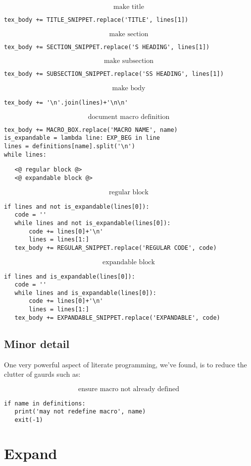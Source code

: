 \documentclass{article}
\begin{document}
$$\boxed{\text{make title}}$${\color{YellowOrange}\begin{verbatim}tex_body += TITLE_SNIPPET.replace('TITLE', lines[1])
\end{verbatim}}$$\boxed{\text{make section}}$${\color{YellowOrange}\begin{verbatim}tex_body += SECTION_SNIPPET.replace('S HEADING', lines[1])
\end{verbatim}}$$\boxed{\text{make subsection}}$${\color{YellowOrange}\begin{verbatim}tex_body += SUBSECTION_SNIPPET.replace('SS HEADING', lines[1])
\end{verbatim}}$$\boxed{\text{make body}}$${\color{YellowOrange}\begin{verbatim}tex_body += '\n'.join(lines)+'\n\n'
\end{verbatim}}$$\boxed{\text{document macro definition}}$${\color{YellowOrange}\begin{verbatim}tex_body += MACRO_BOX.replace('MACRO NAME', name)
is_expandable = lambda line: EXP_BEG in line
lines = definitions[name].split('\n')
while lines:
\end{verbatim}}{\color{MidnightBlue}\begin{verbatim}   <@ regular block @>
   <@ expandable block @>
\end{verbatim}}$$\boxed{\text{regular block}}$${\color{YellowOrange}\begin{verbatim}if lines and not is_expandable(lines[0]):
   code = ''
   while lines and not is_expandable(lines[0]):
       code += lines[0]+'\n'
       lines = lines[1:]
   tex_body += REGULAR_SNIPPET.replace('REGULAR CODE', code)
\end{verbatim}}$$\boxed{\text{expandable block}}$${\color{YellowOrange}\begin{verbatim}if lines and is_expandable(lines[0]):
   code = ''
   while lines and is_expandable(lines[0]):
       code += lines[0]+'\n'
       lines = lines[1:]
   tex_body += EXPANDABLE_SNIPPET.replace('EXPANDABLE', code)
\end{verbatim}}\subsection{Minor detail}

One very powerful aspect of literate programming, we've found, is to reduce the
clutter of gaurds such as:

$$\boxed{\text{ensure macro not already defined}}$${\color{YellowOrange}\begin{verbatim}if name in definitions:
   print('may not redefine macro', name)
   exit(-1)
\end{verbatim}}\section{Expand}
\end{document}
